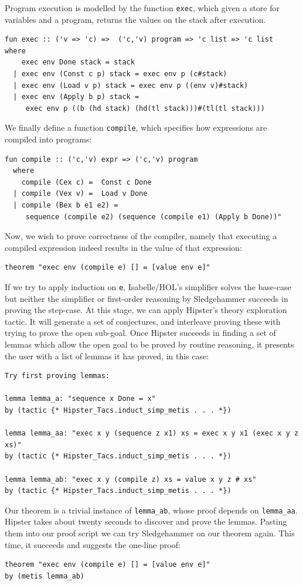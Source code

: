 Program execution is modelled by the function \texttt{exec}, which given a store for variables and a program, returns the values on the stack after execution.
\begin{small}
\begin{verbatim}
fun exec :: ('v => 'c) =>  ('c,'v) program => 'c list => 'c list
where
    exec env Done stack = stack
  | exec env (Const c p) stack = exec env p (c#stack)
  | exec env (Load v p) stack = exec env p ((env v)#stack)
  | exec env (Apply b p) stack =
     exec env p ((b (hd stack) (hd(tl stack)))#(tl(tl stack)))
\end{verbatim}
\end{small}
We finally define a function \texttt{compile}, which specifies how expressions are compiled into programs:
\begin{small}
\begin{verbatim}
fun compile :: ('c,'v) expr => ('c,'v) program
  where
    compile (Cex c) =  Const c Done
  | compile (Vex v) =  Load v Done
  | compile (Bex b e1 e2) =
     sequence (compile e2) (sequence (compile e1) (Apply b Done))"
\end{verbatim}
\end{small}
Now, we wish to prove correctness of the compiler, namely that executing a compiled expression indeed results in the value of that expression: 
\begin{verbatim}
theorem "exec env (compile e) [] = [value env e]"
\end{verbatim}
If we try to apply induction on \texttt{e}, Isabelle/HOL's simplifier solves the base-case but neither the simplifier or first-order reasoning by Sledgehammer succeeds in proving the step-case. At this stage, we can apply Hipster's theory exploration tactic. It will generate a set of conjectures, and interleave proving these with trying to prove the open sub-goal. Once Hipster succeeds in finding a set of lemmas which allow the open goal to be proved by routine reasoning, it presents the user with a list of lemmas it has proved, in this case:
\begin{small}
\begin{verbatim}
Try first proving lemmas:

lemma lemma_a: "sequence x Done = x"
by (tactic {* Hipster_Tacs.induct_simp_metis . . . *})

lemma lemma_aa: "exec x y (sequence z x1) xs = exec x y x1 (exec x y z xs)"
by (tactic {* Hipster_Tacs.induct_simp_metis . . . *})

lemma lemma_ab: "exec x y (compile z) xs = value x y z # xs"
by (tactic {* Hipster_Tacs.induct_simp_metis . . . *})
\end{verbatim}
\end{small}
Our theorem is a trivial instance of \verb|lemma_ab|, whose proof
depends on \verb|lemma_aa|. Hipster takes about twenty seconds to
discover and prove the lemmas.
Pasting them into our proof script we can try Sledgehammer on our theorem again. This time, it succeeds and suggests the one-line proof:%
\begin{verbatim}
theorem "exec env (compile e) [] = [value env e]"
by (metis lemma_ab)
\end{verbatim}
